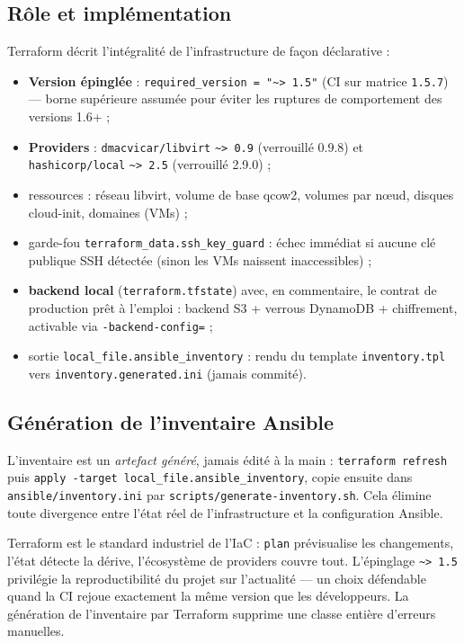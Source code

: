 \documentclass[11pt,a4paper]{article}
\begin{document}
\subsection{Rôle et implémentation}
Terraform décrit l'intégralité de l'infrastructure de façon déclarative :
\begin{itemize}[itemsep=1pt]
  \item \textbf{Version épinglée} : \texttt{required\_version = "\textasciitilde> 1.5"} (CI sur matrice \texttt{1.5.7}) --- borne supérieure assumée pour éviter les ruptures de comportement des versions 1.6+ ;
  \item \textbf{Providers} : \texttt{dmacvicar/libvirt} \texttt{\textasciitilde> 0.9} (verrouillé 0.9.8) et \texttt{hashicorp/local} \texttt{\textasciitilde> 2.5} (verrouillé 2.9.0) ;
  \item ressources : réseau libvirt, volume de base qcow2, volumes par nœud, disques cloud-init, domaines (VMs) ;
  \item garde-fou \texttt{terraform\_data.ssh\_key\_guard} : échec immédiat si aucune clé publique SSH détectée (sinon les VMs naissent inaccessibles) ;
  \item \textbf{backend local} (\texttt{terraform.tfstate}) avec, en commentaire, le contrat de production prêt à l'emploi : backend S3 + verrous DynamoDB + chiffrement, activable via \texttt{-backend-config=} ;
  \item sortie \texttt{local\_file.ansible\_inventory} : rendu du template \texttt{inventory.tpl} vers \texttt{inventory.generated.ini} (jamais commité).
\end{itemize}

\subsection{Génération de l'inventaire Ansible}
L'inventaire est un \emph{artefact généré}, jamais édité à la main : \texttt{terraform refresh} puis \texttt{apply -target local\_file.ansible\_inventory}, copie ensuite dans \texttt{ansible/inventory.ini} par \texttt{scripts/generate-inventory.sh}. Cela élimine toute divergence entre l'état réel de l'infrastructure et la configuration Ansible.

\begin{whybox}
Terraform est le standard industriel de l'IaC : \texttt{plan} prévisualise les changements, l'état détecte la dérive, l'écosystème de providers couvre tout. L'épinglage \texttt{\textasciitilde> 1.5} privilégie la reproductibilité du projet sur l'actualité --- un choix défendable quand la CI rejoue exactement la même version que les développeurs. La génération de l'inventaire par Terraform supprime une classe entière d'erreurs manuelles.
\end{whybox}
\end{document}
